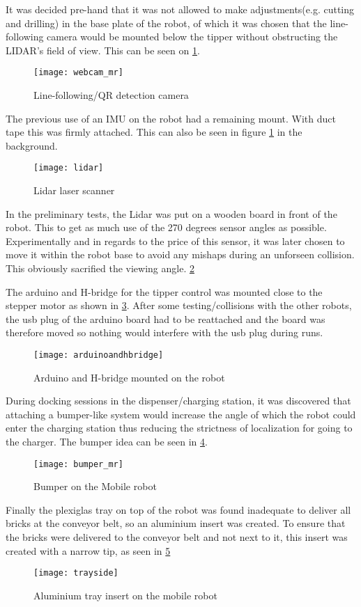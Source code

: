 It was decided pre-hand that it was not allowed to make adjustments(e.g. 
cutting and drilling) in the base plate of the robot, of which it was chosen 
that the line-following camera would be mounted below the tipper without 
obstructing the LIDAR's field of view. This can be seen on \ref{fig:webcam_mr}.
\begin{figure}[H]
	\centering
	\texttt{[image: webcam\_mr]}
	\caption{Line-following/QR detection camera}
	\label{fig:webcam_mr}
	\end{figure}
The previous use of an IMU on the robot had a remaining mount. With duct tape 
this was firmly attached. This can also be seen in figure \ref{fig:webcam_mr} 
in the background.
\begin{figure}[H]
	\centering
	\texttt{[image: lidar]}
	\caption{Lidar laser scanner}
	\label{fig:lidar}
\end{figure}

In the preliminary tests, the Lidar was put on a wooden board in front of the 
robot. This to get as much use of the 270 degrees sensor angles as possible. 
Experimentally and in regards to the price of this sensor, it was later chosen 
to move it within the robot base to avoid any mishaps during an unforseen 
collision. This obviously sacrified the viewing angle.
\ref{fig:lidar}

The arduino and H-bridge for the tipper control was mounted close to the 
stepper motor as shown in \ref{fig:arduino}. After some 
testing/collisions with the other robots, the usb plug of the arduino board had 
to be reattached and the board was therefore moved so nothing would interfere 
with the usb plug during runs. 

\begin{figure}[H]
	\centering
	\texttt{[image: arduinoandhbridge]}
	\caption{Arduino and H-bridge mounted on the robot}
	\label{fig:arduino}
\end{figure}

During docking sessions in the dispenser/charging station, it was discovered 
that attaching a bumper-like system would increase the angle of which the robot 
could enter the charging station thus reducing the strictness of localization 
for going to the charger. The bumper idea can be seen in 
\ref{fig:bumper}.  


\begin{figure}[H]
	\centering
	\texttt{[image: bumper\_mr]}
	\caption{Bumper on the Mobile robot}
	\label{fig:bumper}
\end{figure}
Finally the plexiglas tray on top of the robot was found inadequate to deliver 
all bricks at the conveyor belt, so an aluminium insert was created. To ensure 
that the bricks were delivered to the conveyor belt and not next to it, this 
insert was created with a narrow tip, as seen in \ref{fig:tray}

\begin{figure}[H]
	\centering
	\texttt{[image: trayside]}
	\caption{Aluminium tray insert on the mobile robot}
	\label{fig:tray}
\end{figure}

